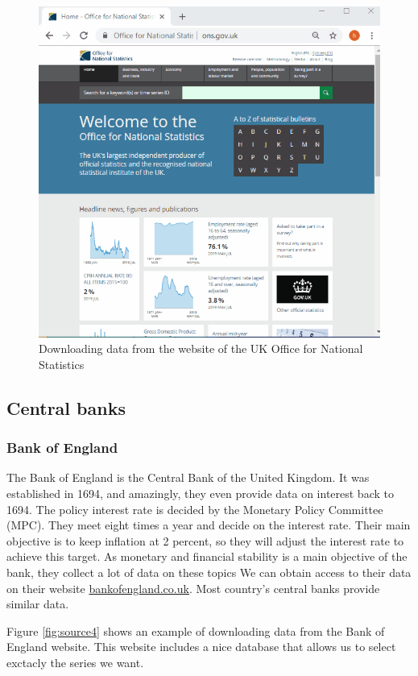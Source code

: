 \documentclass[]{book}
\begin{document}
\begin{figure}

{\centering \includegraphics[width=0.6\linewidth]{_resources/chapter_sources/gettingpopdata} 

}

\caption{Downloading data from the website of the UK Office for National Statistics}\label{fig:source3}
\end{figure}

\hypertarget{central-banks}{%
\subsection{Central banks}\label{central-banks}}

\hypertarget{bank-of-england}{%
\subsubsection{Bank of England}\label{bank-of-england}}

The Bank of England is the Central Bank of the United Kingdom. It was established in 1694, and amazingly, they even provide data on interest back to 1694. The policy interest rate is decided by the Monetary Policy Committee (MPC). They meet eight times a year and decide on the interest rate. Their main objective is to keep inflation at 2 percent, so they will adjust the interest rate to achieve this target. As monetary and financial stability is a main objective of the bank, they collect a lot of data on these topics We can obtain access to their data on their website \href{https://www.bankofengland.co.uk}{bankofengland.co.uk}. Most country's central banks provide similar data.

Figure \ref{fig:source4} shows an example of downloading data from the Bank of England website. This website includes a nice database that allows us to select exctacly the series we want.
\end{document}

